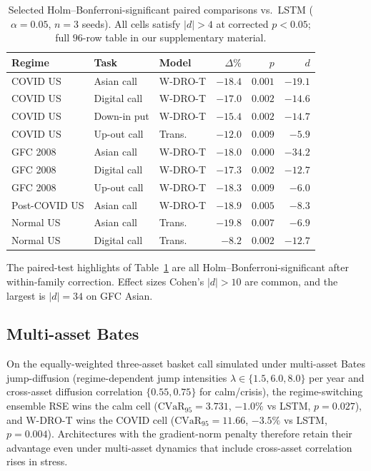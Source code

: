 \documentclass[11pt]{article}
\newcommand{\cvar}{\mathrm{CVaR}}
\begin{document}
\begin{table}[t]
\centering\scriptsize
\caption{Selected Holm--Bonferroni-significant paired comparisons vs.\ LSTM ($\alpha=0.05$, $n=3$ seeds).  All cells satisfy $|d|>4$ at corrected $p<0.05$; full $96$-row table in our supplementary material.}
\label{tab:paired}
\begin{tabular}{lllrrr}
\toprule
Regime & Task & Model & $\Delta\%$ & $p$ & $d$ \\\midrule
COVID US & Asian call    & W-DRO-T & $-18.4$ & $0.001$ & $-19.1$ \\
COVID US & Digital call  & W-DRO-T & $-17.0$ & $0.002$ & $-14.6$ \\
COVID US & Down-in put   & W-DRO-T & $-15.4$ & $0.002$ & $-14.7$ \\
COVID US & Up-out call   & Trans.  & $-12.0$ & $0.009$ & $-5.9$  \\
GFC 2008 & Asian call    & W-DRO-T & $-18.0$ & $0.000$ & $-34.2$ \\
GFC 2008 & Digital call  & W-DRO-T & $-17.3$ & $0.002$ & $-12.7$ \\
GFC 2008 & Up-out call   & W-DRO-T & $-18.3$ & $0.009$ & $-6.0$  \\
Post-COVID US & Asian call & W-DRO-T & $-18.9$ & $0.005$ & $-8.3$ \\
Normal US & Asian call    & Trans.  & $-19.8$ & $0.007$ & $-6.9$ \\
Normal US & Digital call  & Trans.  & $-8.2$  & $0.002$ & $-12.7$ \\
\bottomrule
\end{tabular}
\end{table}

The paired-test highlights of Table~\ref{tab:paired} are all Holm--Bonferroni-significant after within-family correction.  Effect sizes Cohen's $|d|>10$ are common, and the largest is $|d|=34$ on GFC Asian.

\subsection{Multi-asset Bates}

On the equally-weighted three-asset basket call simulated under multi-asset Bates jump-diffusion (regime-dependent jump intensities $\lambda\in\{1.5,6.0,8.0\}$ per year and cross-asset diffusion correlation $\{0.55, 0.75\}$ for calm/crisis), the regime-switching ensemble RSE wins the calm cell ($\cvar_{95}=3.731$, $-1.0\%$ vs LSTM, $p=0.027$), and W-DRO-T wins the COVID cell ($\cvar_{95}=11.66$, $-3.5\%$ vs LSTM, $p=0.004$).  Architectures with the gradient-norm penalty therefore retain their advantage even under multi-asset dynamics that include cross-asset correlation rises in stress.
\end{document}
